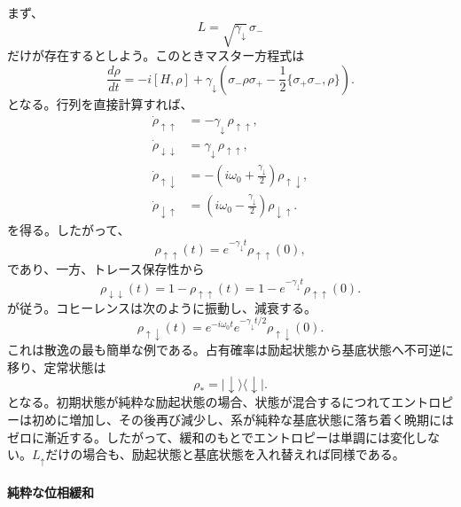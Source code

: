 \documentclass[a4paper,11pt,oneside]{article}
\theoremstyle{definition}
\numberwithin{equation}{section}
\begin{document}
まず、
\begin{equation}
L=\sqrt{\gamma_\downarrow}\,\sigma_-
\end{equation}
だけが存在するとしよう。このときマスター方程式は
\begin{equation}
\frac{d\rho}{dt}
=
-i[H,\rho]
+
\gamma_\downarrow
\left(
\sigma_- \rho \sigma_+
-\frac12\{\sigma_+\sigma_-,\rho\}
\right) .
\end{equation}
となる。行列を直接計算すれば、
\begin{align}
\dot\rho_{\uparrow\uparrow} &= -\gamma_\downarrow\,\rho_{\uparrow\uparrow} ,
\\
\dot\rho_{\downarrow\downarrow} &= \gamma_\downarrow\,\rho_{\uparrow\uparrow} ,
\\
\dot\rho_{\uparrow\downarrow}
&=
-\left(i\omega_0+\frac{\gamma_\downarrow}{2}\right)\rho_{\uparrow\downarrow} ,
\\
\dot\rho_{\downarrow\uparrow}
&=
\left(i\omega_0-\frac{\gamma_\downarrow}{2}\right)\rho_{\downarrow\uparrow} .
\end{align}
を得る。したがって、
\begin{equation}
\rho_{\uparrow\uparrow}(t)=e^{-\gamma_\downarrow t}\rho_{\uparrow\uparrow}(0),
\end{equation}
であり、一方、トレース保存性から
\begin{equation}
\rho_{\downarrow\downarrow}(t)=1-\rho_{\uparrow\uparrow}(t)
=1-e^{-\gamma_\downarrow t}\rho_{\uparrow\uparrow}(0).
\end{equation}
が従う。コヒーレンスは次のように振動し、減衰する。
\begin{equation}
\rho_{\uparrow\downarrow}(t)
=
e^{-i\omega_0 t}e^{-\gamma_\downarrow t/2}\rho_{\uparrow\downarrow}(0) .
\end{equation}
これは散逸の最も簡単な例である。占有確率は励起状態から基底状態へ不可逆に移り、定常状態は
\begin{equation}
\rho_\ast = |\downarrow\rangle\langle\downarrow| .
\end{equation}
となる。初期状態が純粋な励起状態の場合、状態が混合するにつれてエントロピーは初めに増加し、その後再び減少し、系が純粋な基底状態に落ち着く晩期にはゼロに漸近する。したがって、緩和のもとでエントロピーは単調には変化しない。$  L_{\uparrow} $だけの場合も、励起状態と基底状態を入れ替えれば同様である。






\paragraph{純粋な位相緩和}
\end{document}
